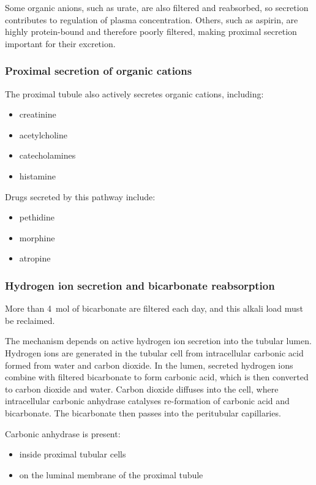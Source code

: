 \documentclass[11pt,a4paper]{article}
\begin{document}
Some organic anions, such as urate, are also filtered and reabsorbed, so secretion contributes to regulation of plasma concentration. Others, such as aspirin, are highly protein-bound and therefore poorly filtered, making proximal secretion important for their excretion.

\subsubsection{Proximal secretion of organic cations}

The proximal tubule also actively secretes organic cations, including:
\begin{itemize}
    \item creatinine
    \item acetylcholine
    \item catecholamines
    \item histamine
\end{itemize}

Drugs secreted by this pathway include:
\begin{itemize}
    \item pethidine
    \item morphine
    \item atropine
\end{itemize}

\subsubsection{Hydrogen ion secretion and bicarbonate reabsorption}

More than 4~mol of bicarbonate are filtered each day, and this alkali load must be reclaimed.

The mechanism depends on active hydrogen ion secretion into the tubular lumen. Hydrogen ions are generated in the tubular cell from intracellular carbonic acid formed from water and carbon dioxide. In the lumen, secreted hydrogen ions combine with filtered bicarbonate to form carbonic acid, which is then converted to carbon dioxide and water. Carbon dioxide diffuses into the cell, where intracellular carbonic anhydrase catalyses re-formation of carbonic acid and bicarbonate. The bicarbonate then passes into the peritubular capillaries.

Carbonic anhydrase is present:
\begin{itemize}
    \item inside proximal tubular cells
    \item on the luminal membrane of the proximal tubule
\end{itemize}
\end{document}
